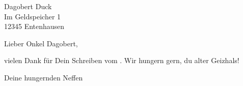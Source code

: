 \documentclass[12pt,fromalign=center,fromrule=aftername]{scrlttr2}
\begin{document}
\begin{letter}{Dagobert Duck \\ Im Geldspeicher 1 \\ 12345 Entenhausen}

\opening{Lieber Onkel Dagobert,}

vielen Dank für Dein Schreiben vom . Wir hungern gern, du alter Geizhals!

\blindtext[3]

\closing{Deine hungernden Neffen}

\end{letter}
\end{document}
